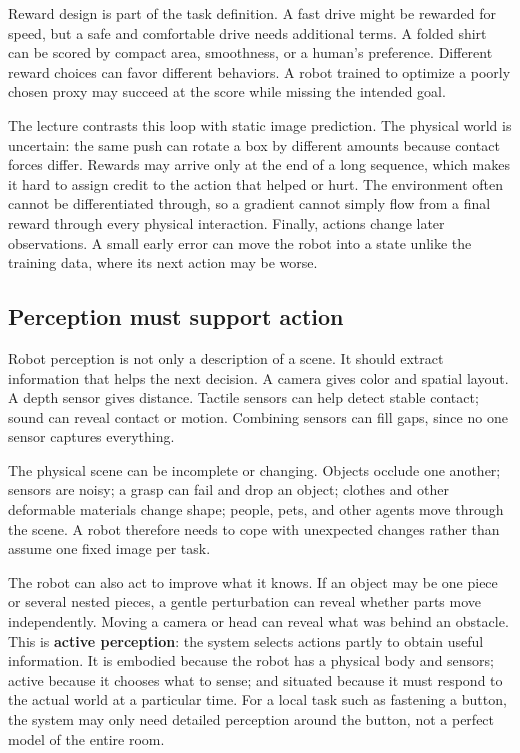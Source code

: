 Reward design is part of the task definition. A fast drive might be rewarded for speed, but a safe and comfortable drive needs additional terms. A folded shirt can be scored by compact area, smoothness, or a human's preference. Different reward choices can favor different behaviors. A robot trained to optimize a poorly chosen proxy may succeed at the score while missing the intended goal.

The lecture contrasts this loop with static image prediction. The physical world is uncertain: the same push can rotate a box by different amounts because contact forces differ. Rewards may arrive only at the end of a long sequence, which makes it hard to assign credit to the action that helped or hurt. The environment often cannot be differentiated through, so a gradient cannot simply flow from a final reward through every physical interaction. Finally, actions change later observations. A small early error can move the robot into a state unlike the training data, where its next action may be worse.

\subsection{Perception must support action}\label{04-visual-computing-ii-ch034-perception-must-support-action}

Robot perception is not only a description of a scene. It should extract information that helps the next decision. A camera gives color and spatial layout. A depth sensor gives distance. Tactile sensors can help detect stable contact; sound can reveal contact or motion. Combining sensors can fill gaps, since no one sensor captures everything.

The physical scene can be incomplete or changing. Objects occlude one another; sensors are noisy; a grasp can fail and drop an object; clothes and other deformable materials change shape; people, pets, and other agents move through the scene. A robot therefore needs to cope with unexpected changes rather than assume one fixed image per task.

The robot can also act to improve what it knows. If an object may be one piece or several nested pieces, a gentle perturbation can reveal whether parts move independently. Moving a camera or head can reveal what was behind an obstacle. This is \textbf{active perception}: the system selects actions partly to obtain useful information. It is embodied because the robot has a physical body and sensors; active because it chooses what to sense; and situated because it must respond to the actual world at a particular time. For a local task such as fastening a button, the system may only need detailed perception around the button, not a perfect model of the entire room.

